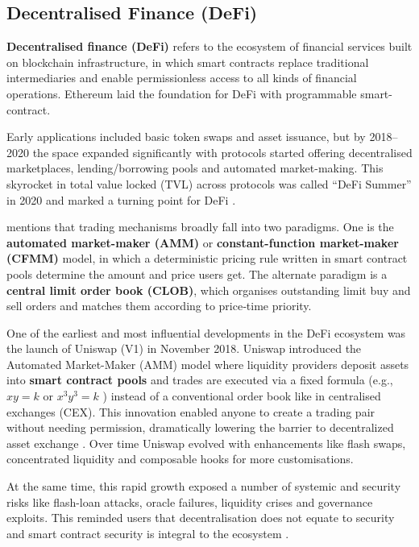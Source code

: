 \documentclass[12pt,a4paper]{article}
\begin{document}
\subsection{Decentralised Finance (DeFi)}
\textbf{Decentralised finance (DeFi)} refers to the ecosystem of financial services built on blockchain infrastructure, in which smart contracts replace traditional intermediaries and enable permissionless access to all kinds of financial operations. Ethereum \parencite{ethereum} laid the foundation for DeFi with programmable smart-contract. 

Early applications included basic token swaps and asset issuance, but by 2018–2020 the space expanded significantly with protocols started offering decentralised marketplaces, lending/borrowing pools and automated market-making. This skyrocket in total value locked (TVL) across protocols was called “DeFi Summer” in 2020 and marked a turning point for DeFi \parencite{fang2021defi}.

\textcite{hagele2024centralized} mentions that trading mechanisms broadly fall into two paradigms. One is the \textbf{automated market-maker (AMM)} or \textbf{constant-function market-maker (CFMM)} model, in which a deterministic pricing rule written in smart contract pools determine the amount and price users get. The alternate paradigm is a \textbf{central limit order book (CLOB)}, which organises outstanding limit buy and sell orders and matches them according to price‐time priority. 

One of the earliest and most influential developments in the DeFi ecosystem was the launch of Uniswap (V1) in November 2018. Uniswap introduced the Automated Market-Maker (AMM) model where liquidity providers deposit assets into \textbf{smart contract pools} and trades are executed via a fixed formula (e.g., $xy = k$ or $x^3y^3=k$ ) instead of a conventional order book like in centralised exchanges (CEX). This innovation enabled anyone to create a trading pair without needing permission, dramatically lowering the barrier to decentralized asset exchange \parencite{adams2021uniswap}. Over time Uniswap evolved with enhancements like flash swaps, concentrated liquidity and composable hooks for more customisations.

At the same time, this rapid growth exposed a number of systemic and security risks like flash-loan attacks, oracle failures, liquidity crises and governance exploits. This reminded users that decentralisation does not equate to security and smart contract security is integral to the ecosystem \parencite{kaur2023smart}. 
\end{document}
